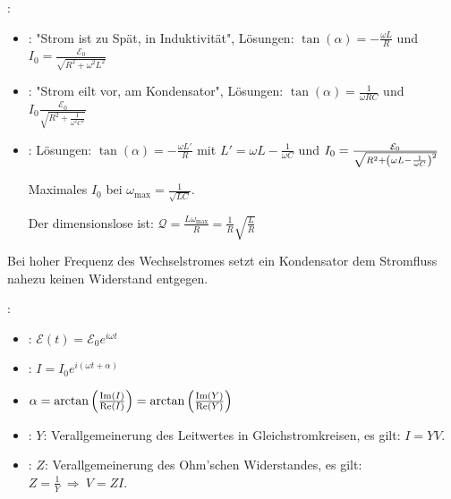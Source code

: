 \vspace{1\baselineskip}

:
\begin{itemize}
    \item {}: "Strom ist zu Spät, in Induktivität", Lösungen:
            $\tan(\alpha) = - \frac{\omega L}{R}$ und $I_0 =
            \frac{\mathcal{E}_0}{\sqrt{R^2 + \omega^2 L^2}}$
    \item {}: "Strom eilt vor, am Kondensator", Lösungen:
            $\tan(\alpha) = \frac{1}{\omega R C}$ und $I_0
            \frac{\mathcal{E}_0}{\sqrt{R^2 + \frac{1}{\omega^2 C^2}}}$
    \item {}: Lösungen: $\tan(\alpha) = - \frac{\omega L'}{R}$ mit
            $L' = \omega L - \frac{1}{\omega C}$ und $I_0 =
            \frac{\mathcal{E}_0}{\sqrt{R^2 + \left( \omega L - \frac{1}{\omega C} \right)^2}}$

            Maximales $I_0$ bei $\omega_{\text{max}} = \frac{1}{\sqrt{LC}}$.

            Der dimensionslose  ist: $\mathcal{Q} = \frac{L \omega_{\text{max}}}{R}
            = \frac{1}{R} \sqrt{\frac{L}{R}}$
\end{itemize}

\vspace{1\baselineskip}

Bei hoher Frequenz des Wechselstromes setzt ein Kondensator dem Stromfluss nahezu keinen
Widerstand entgegen.

\vspace{1\baselineskip}

:

\begin{itemize}
    \item {}: $\mathcal{E} (t) = \mathcal{E}_0 e^{i \omega t}$
    \item {}: $I = I_0 e^{i (\omega t + \alpha)}$
    \item $\alpha = \arctan \left( \frac{\text{Im} (I)}{\text{Re} (I)} \right) =
            \arctan \left( \frac{\text{Im} (Y)}{\text{Re} (Y)} \right)$
    \item {}: $Y$: Verallgemeinerung des Leitwertes in Gleichstromkreisen,
            es gilt: $I = Y V$.
    \item {}: $Z$: Verallgemeinerung des Ohm'schen Widerstandes, es gilt:
            $Z = \frac{1}{Y} \ \Rightarrow \ V = Z I$.
\end{itemize}

